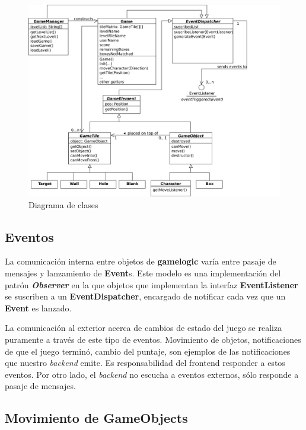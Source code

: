 \documentclass[a4paper,12pt,titlepage]{article}
\begin{document}
\begin{center}
	\begin{figure}[h]
		\center \includegraphics{ClassDiagram.png}
		\caption{Diagrama de clases}
	\end{figure}
\end{center}

\subsection{Eventos}

La comunicación interna entre objetos de \textbf{gamelogic} varía entre pasaje de mensajes y lanzamiento de \textbf{Event}s. Este modelo es una implementación del patrón \textbf{\emph{Observer}} en la que objetos que implementan la interfaz \textbf{EventListener} se suscriben a un \textbf{EventDispatcher}, encargado de notificar cada vez que un \textbf{Event} es lanzado.

La comunicación al exterior acerca de cambios de estado del juego se realiza puramente a través de este tipo de eventos. Movimiento de objetos, notificaciones de que el juego terminó, cambio del puntaje, son ejemplos de las notificaciones que nuestro \emph{backend} emite. Es responsabilidad del frontend responder a estos eventos. Por otro lado, el \emph{backend} no escucha a eventos externos, sólo responde a pasaje de mensajes.

\subsection{Movimiento de \textbf{GameObject}s}
\end{document}
